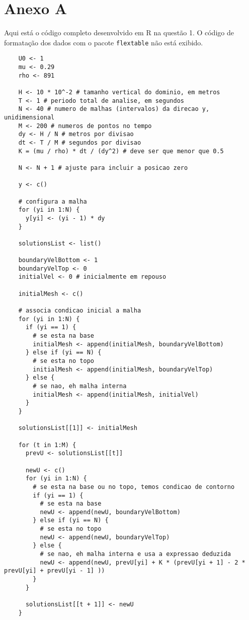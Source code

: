 \section*{Anexo A}

Aqui está o código completo desenvolvido em R na questão 1. O código de formatação dos dados com o pacote
\verb|flextable| não está exibido. 

\begin{lstlisting}
    U0 <- 1
    mu <- 0.29
    rho <- 891
    
    H <- 10 * 10^-2 # tamanho vertical do dominio, em metros
    T <- 1 # periodo total de analise, em segundos
    N <- 40 # numero de malhas (intervalos) da direcao y, unidimensional
    M <- 200 # numeros de pontos no tempo
    dy <- H / N # metros por divisao
    dt <- T / M # segundos por divisao
    K = (mu / rho) * dt / (dy^2) # deve ser que menor que 0.5
    
    N <- N + 1 # ajuste para incluir a posicao zero
    
    y <- c()
    
    # configura a malha
    for (yi in 1:N) {
      y[yi] <- (yi - 1) * dy
    }
    
    solutionsList <- list()
    
    boundaryVelBottom <- 1
    boundaryVelTop <- 0
    initialVel <- 0 # inicialmente em repouso
    
    initialMesh <- c()
    
    # associa condicao inicial a malha
    for (yi in 1:N) {
      if (yi == 1) {
        # se esta na base
        initialMesh <- append(initialMesh, boundaryVelBottom)
      } else if (yi == N) {
        # se esta no topo
        initialMesh <- append(initialMesh, boundaryVelTop)
      } else {
        # se nao, eh malha interna 
        initialMesh <- append(initialMesh, initialVel)
      }
    }
    
    solutionsList[[1]] <- initialMesh
    
    for (t in 1:M) {
      prevU <- solutionsList[[t]]
      
      newU <- c()
      for (yi in 1:N) {
        # se esta na base ou no topo, temos condicao de contorno
        if (yi == 1) {
          # se esta na base
          newU <- append(newU, boundaryVelBottom)
        } else if (yi == N) {
          # se esta no topo
          newU <- append(newU, boundaryVelTop)
        } else {
          # se nao, eh malha interna e usa a expressao deduzida
          newU <- append(newU, prevU[yi] + K * (prevU[yi + 1] - 2 * prevU[yi] + prevU[yi - 1] ))
        }
      }
      
      solutionsList[[t + 1]] <- newU
    }
    
\end{lstlisting}